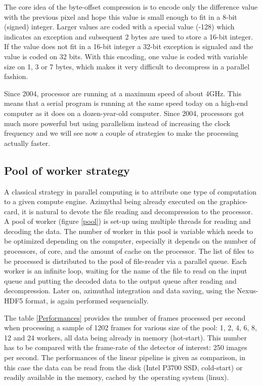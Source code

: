 \documentclass[preprint, pdf]{iucr}              %
\begin{document}
The core idea of the byte-offset compression is to encode only the difference
value with the previous pixel and hope this value is small enough to fit in a
8-bit (signed) integer. 
Larger values are coded with a special value (-128) which indicates an exception
and subsequent 2 bytes are used to store a 16-bit integer. 
If the value does not fit in a 16-bit integer a 32-bit exception is signaled and
the value is coded on 32 bits. 
With this encoding, one value is coded with variable size on 1, 3 or 7 bytes,
which makes it very difficult to decompress in a parallel fashion.

Since 2004, processor are running at a maximum speed of about 4GHz. 
This means that a serial program is running at the same speed today on a
high-end computer as it does on a dozen-year-old computer.
Since 2004, processors got much more powerful but using parallelism instead
of increasing the clock frequency and we will see now a couple of strategies to
make the processing actually faster.

\subsection{Pool of worker strategy} 

A classical strategy in parallel computing is to attribute one type of
computation to a given compute engine.
Azimythal being already executed on the graphics-card, it is natural to devote
the file reading and decompression to the processor.
A pool of worker (figure \ref{pool}) is set-up using multiple threads for
reading and decoding the data. 
The number of worker in this pool is variable which needs to be optimized 
depending on the computer, especially it depends on the number of processors,
of core, and the amount of cache on the processor.
The list of files to be processed is distributed to the pool of file-reader via
a parallel queue.
Each worker is an infinite loop, waiting for the name of the file to read 
on the input queue and putting the decoded data to the output queue after
reading and decompression.
Later on, azimuthal integration and data saving, using the Nexus-HDF5
format\cite{nexus}, is again performed sequencially.

The table \ref{Performances} provides the number of frames processed per second
when processing a sample of 1202 frames for various size of the pool:
1, 2, 4, 6, 8, 12 and 24 workers, all data being already in memory (hot-start).
This number has to be compared with the frame-rate of the detector of interest:
250 images per second.
The performances of the linear pipeline is given as comparison, in this case the
data can be read from the disk (Intel P3700 SSD, cold-start) or readily
available in the memory, cached by the operating system (linux).
\end{document}
